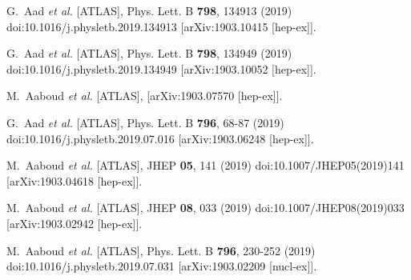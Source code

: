 \begin{thebibliography}{9}
G.~Aad \textit{et al.} [ATLAS],
Phys. Lett. B \textbf{798}, 134913 (2019)
doi:10.1016/j.physletb.2019.134913
[arXiv:1903.10415 [hep-ex]].

G.~Aad \textit{et al.} [ATLAS],
Phys. Lett. B \textbf{798}, 134949 (2019)
doi:10.1016/j.physletb.2019.134949
[arXiv:1903.10052 [hep-ex]].

M.~Aaboud \textit{et al.} [ATLAS],
[arXiv:1903.07570 [hep-ex]].

G.~Aad \textit{et al.} [ATLAS],
Phys. Lett. B \textbf{796}, 68-87 (2019)
doi:10.1016/j.physletb.2019.07.016
[arXiv:1903.06248 [hep-ex]].

M.~Aaboud \textit{et al.} [ATLAS],
JHEP \textbf{05}, 141 (2019)
doi:10.1007/JHEP05(2019)141
[arXiv:1903.04618 [hep-ex]].

M.~Aaboud \textit{et al.} [ATLAS],
JHEP \textbf{08}, 033 (2019)
doi:10.1007/JHEP08(2019)033
[arXiv:1903.02942 [hep-ex]].

M.~Aaboud \textit{et al.} [ATLAS],
Phys. Lett. B \textbf{796}, 230-252 (2019)
doi:10.1016/j.physletb.2019.07.031
[arXiv:1903.02209 [nucl-ex]].


\end{thebibliography}
